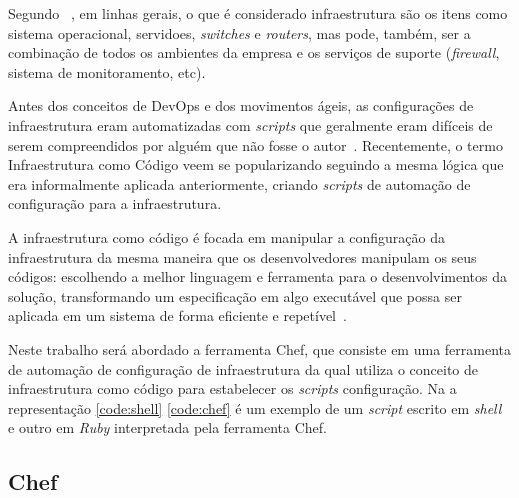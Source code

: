 Segundo ~, em linhas gerais, o que é considerado
infraestrutura são os itens como sistema operacional, servidoes,
\textit{switches} e \textit{routers}, mas pode, também, ser a combinação
de todos os ambientes da empresa e os serviços de suporte (\textit{firewall},
sistema de monitoramento, etc).

Antes dos conceitos de DevOps e dos movimentos ágeis, as configurações de
infraestrutura eram automatizadas com \textit{scripts} que geralmente eram
difíceis de serem compreendidos por alguém que não fosse o autor~\cite{huttermann:2012}.
Recentemente, o termo Infraestrutura como Código veem se popularizando
seguindo a mesma lógica que era informalmente aplicada anteriormente, criando
\textit{scripts} de automação de configuração para a infraestrutura.

A infraestrutura como código é focada em manipular a configuração da infraestrutura
da mesma maneira que os desenvolvedores manipulam os seus códigos: escolhendo a melhor
linguagem e ferramenta para o desenvolvimentos da solução, transformando um especificação
em algo executável que possa ser aplicada em um sistema de forma eficiente e
repetível~\cite{huttermann:2012}. \\

\noindent\begin{minipage}{.45\textwidth}
  \label{code:shell}
  \lstset{style=shell}
  
\end{minipage}\hfill
\begin{minipage}{.45\textwidth}
  \label{code:chef}
  \lstset{style=shell}
  
\end{minipage}


Neste trabalho será abordado a ferramenta Chef, que consiste em uma ferramenta de
automação de configuração de infraestrutura da qual utiliza o conceito de infraestrutura
como código para estabelecer os \textit{scripts} configuração. Na a representação \ref{code:shell}
\ref{code:chef} é um exemplo de um \textit{script} escrito em \textit{shell} e outro em \textit{Ruby}
interpretada pela ferramenta Chef.

\subsection{Chef}
\label{sec:chef}

